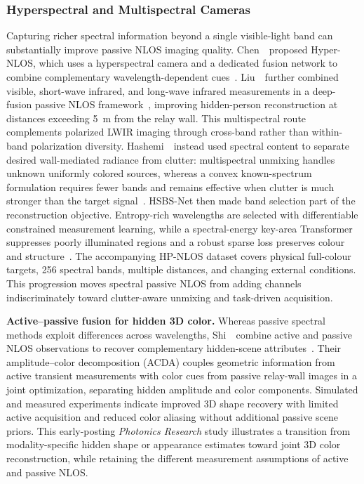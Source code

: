 \subsubsection{Hyperspectral and Multispectral Cameras}
Capturing richer spectral information beyond a single visible-light band can substantially improve passive NLOS imaging quality. Chen~\etal~proposed Hyper-NLOS, which uses a hyperspectral camera and a dedicated fusion network to combine complementary wavelength-dependent cues~\cite{chenHyperNLOS2024}. Liu~\etal~further combined visible, short-wave infrared, and long-wave infrared measurements in a deep-fusion passive NLOS framework~\cite{liuMultispectralDeepFusionNLOS2025}, improving hidden-person reconstruction at distances exceeding 5~m from the relay wall. This multispectral route complements polarized LWIR imaging through cross-band rather than within-band polarization diversity. Hashemi~\etal~instead used spectral content to separate desired wall-mediated radiance from clutter: multispectral unmixing handles unknown uniformly colored sources, whereas a convex known-spectrum formulation requires fewer bands and remains effective when clutter is much stronger than the target signal~\cite{hashemiSpectralContentPassiveNLOS2025}. HSBS-Net then made band selection part of the reconstruction objective. Entropy-rich wavelengths are selected with differentiable constrained measurement learning, while a spectral-energy key-area Transformer suppresses poorly illuminated regions and a robust sparse loss preserves colour and structure~\cite{chenHyperspectralBandSelectionNLOS2025}. The accompanying HP-NLOS dataset covers physical full-colour targets, 256 spectral bands, multiple distances, and changing external conditions. This progression moves spectral passive NLOS from adding channels indiscriminately toward clutter-aware unmixing and task-driven acquisition.

\vspace{0.8mm}
\noindent \textbf{Active--passive fusion for hidden 3D color.}
Whereas passive spectral methods exploit differences across wavelengths, Shi~\etal~combine active and passive NLOS observations to recover complementary hidden-scene attributes~\cite{shiHybridActivePassiveColor2026}. Their amplitude--color decomposition (ACDA) couples geometric information from active transient measurements with color cues from passive relay-wall images in a joint optimization, separating hidden amplitude and color components. Simulated and measured experiments indicate improved 3D shape recovery with limited active acquisition and reduced color aliasing without additional passive scene priors. This early-posting \emph{Photonics Research} study illustrates a transition from modality-specific hidden shape or appearance estimates toward joint 3D color reconstruction, while retaining the different measurement assumptions of active and passive NLOS.

